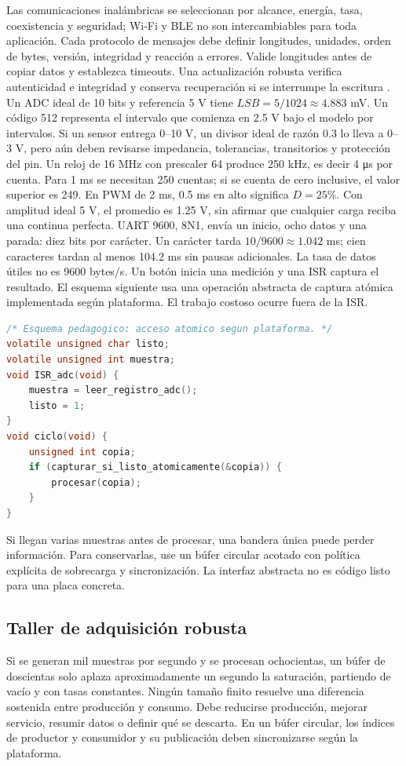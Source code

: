 Las comunicaciones inalámbricas se seleccionan por alcance, energía, tasa, coexistencia y seguridad; Wi-Fi y BLE no son intercambiables para toda aplicación. Cada protocolo de mensajes debe definir longitudes, unidades, orden de bytes, versión, integridad y reacción a errores. Valide longitudes antes de copiar datos y establezca timeouts. Una actualización robusta verifica autenticidad e integridad y conserva recuperación si se interrumpe la escritura \cite{avr,arduino}.
Un ADC ideal de 10 bits y referencia 5 V tiene $LSB=5/1024\approx4.883$ mV. Un código 512 representa el intervalo que comienza en 2.5 V bajo el modelo por intervalos. Si un sensor entrega 0--10 V, un divisor ideal de razón 0.3 lo lleva a 0--3 V, pero aún deben revisarse impedancia, tolerancias, transitorios y protección del pin.
Un reloj de 16 MHz con prescaler 64 produce 250 kHz, es decir 4 μs por cuenta. Para 1 ms se necesitan 250 cuentas; si se cuenta de cero inclusive, el valor superior es 249. En PWM de 2 ms, 0.5 ms en alto significa $D=25\%$. Con amplitud ideal 5 V, el promedio es 1.25 V, sin afirmar que cualquier carga reciba una continua perfecta.
UART 9600, 8N1, envía un inicio, ocho datos y una parada: diez bits por carácter. Un carácter tarda $10/9600\approx1.042$ ms; cien caracteres tardan al menos 104.2 ms sin pausas adicionales. La tasa de datos útiles no es 9600 bytes/s.
Un botón inicia una medición y una ISR captura el resultado. El esquema siguiente usa una operación abstracta de captura atómica implementada según plataforma. El trabajo costoso ocurre fuera de la ISR.
\begin{lstlisting}[language=C]
/* Esquema pedagogico: acceso atomico segun plataforma. */
volatile unsigned char listo;
volatile unsigned int muestra;
void ISR_adc(void) {
    muestra = leer_registro_adc();
    listo = 1;
}
void ciclo(void) {
    unsigned int copia;
    if (capturar_si_listo_atomicamente(&copia)) {
        procesar(copia);
    }
}
\end{lstlisting}
Si llegan varias muestras antes de procesar, una bandera única puede perder información. Para conservarlas, use un búfer circular acotado con política explícita de sobrecarga y sincronización. La interfaz abstracta no es código listo para una placa concreta.

\subsection{Taller de adquisición robusta}
Si se generan mil muestras por segundo y se procesan ochocientas, un búfer de doscientas solo aplaza aproximadamente un segundo la saturación, partiendo de vacío y con tasas constantes. Ningún tamaño finito resuelve una diferencia sostenida entre producción y consumo. Debe reducirse producción, mejorar servicio, resumir datos o definir qué se descarta. En un búfer circular, los índices de productor y consumidor y su publicación deben sincronizarse según la plataforma.

